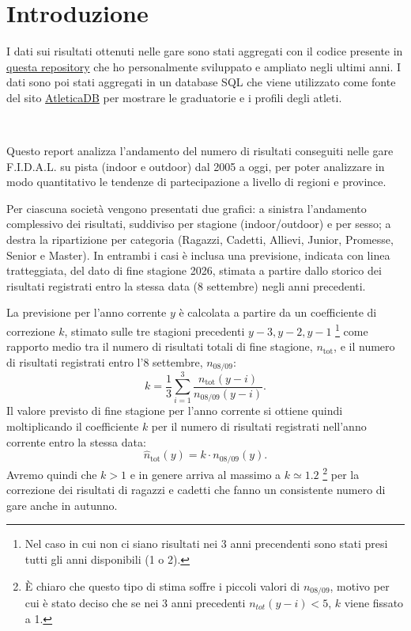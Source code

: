 \documentclass[a4paper, landscape]{article}
\begin{document}
\clearpage
\thispagestyle{fancy}
\tableofcontents
\clearpage

\section{Introduzione}

I dati sui risultati ottenuti nelle gare sono stati aggregati con il codice
presente in \href{https://github.com/F-Depi/database-atletica-italiana/}{questa repository} 
che ho personalmente sviluppato e ampliato negli ultimi anni.
I dati sono poi stati aggregati in un database SQL che viene utilizzato come
fonte del sito \href{https://atletica.mooo.com}{AtleticaDB} per mostrare le
graduatorie e i profili degli atleti.

~

Questo report analizza l'andamento del numero di risultati conseguiti nelle gare
F.I.D.A.L. su pista (indoor e outdoor) dal 2005 a oggi, per poter analizzare in
modo quantitativo le tendenze di partecipazione a livello di regioni e province.

Per ciascuna società vengono presentati due grafici: a sinistra l'andamento
complessivo dei risultati, suddiviso per stagione (indoor/outdoor) e per sesso;
a destra la ripartizione per categoria (Ragazzi, Cadetti, Allievi, Junior,
Promesse, Senior e Master).
In entrambi i casi è inclusa una previsione, indicata con linea tratteggiata,
del dato di fine stagione 2026, stimata a partire dallo storico dei risultati
registrati entro la stessa data (8 settembre) negli anni precedenti.

La previsione per l'anno corrente $y$ è calcolata a partire da un coefficiente
di correzione $k$, stimato sulle tre stagioni precedenti $y-3, y-2, y-1$ 
\footnote{Nel caso in cui non ci siano risultati nei 3 anni precendenti  sono
stati presi tutti gli anni disponibili (1 o 2).}
come rapporto medio tra il numero di risultati totali di fine stagione, 
$n_{\text{tot}}$, e il numero di risultati registrati entro l'8 settembre, 
$n_{\text{08/09}}$:
\[
    k = \frac{1}{3}\sum_{i=1}^{3} \frac{n_{\text{tot}}(y-i)}{n_{\text{08/09}}(y-i)}.
\]
Il valore previsto di fine stagione per l'anno corrente si ottiene quindi
moltiplicando il coefficiente $k$ per il numero di risultati registrati
nell'anno corrente entro la stessa data:
\[
    \hat{n}_{\text{tot}}(y) = k \cdot n_{\text{08/09}}(y).
\]
Avremo quindi che $k > 1$ e in genere arriva al massimo a $k \simeq 1.2$
\footnote{È chiaro che questo tipo di stima soffre i piccoli valori di $n_{08/09}$,
motivo per cui è stato deciso che se nei 3 anni precedenti $n_{tot}(y-i) < 5$,
$k$ viene fissato a 1.}
per la correzione dei risultati di ragazzi e cadetti che fanno un consistente 
numero di gare anche in autunno.
\end{document}
